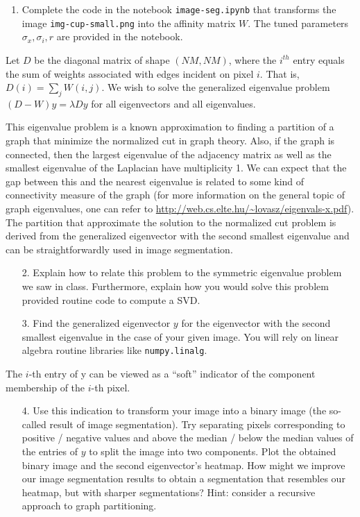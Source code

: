 \documentclass[11pt]{article}
\begin{document}
\begin{enumerate}
    \item Complete the code in the notebook \texttt{image-seg.ipynb} that transforms the image \texttt{img-cup-small.png} into the affinity matrix $W$. The tuned parameters $\sigma_x, \sigma_i, r$ are provided in the notebook.
\end{enumerate}

Let $D$ be the diagonal matrix of shape $(NM, NM)$, where the $i^{th}$ entry equals the sum of weights associated with edges incident on pixel $i$. That is, $D(i) = \sum_{j} W(i, j)$. We wish to solve the generalized eigenvalue problem $(D - W)y = \lambda Dy$ for all eigenvectors and all eigenvalues.

This eigenvalue problem is a known approximation to finding a partition of a graph that minimize the normalized cut in graph theory. Also, if the graph is connected, then the largest eigenvalue of the adjacency matrix as well as the smallest eigenvalue of the Laplacian have multiplicity 1. We can expect that the gap between this and the nearest eigenvalue is related to some kind of connectivity measure of the graph (for more information on the general topic of graph eigenvalues, one can refer to \url{http://web.cs.elte.hu/~lovasz/eigenvals-x.pdf}). The partition that approximate the solution to the normalized cut problem is derived from the generalized eigenvector with the second smallest eigenvalue and can be straightforwardly used in image segmentation.

\begin{enumerate}
    \item[2.] Explain how to relate this problem to the symmetric eigenvalue problem we saw in class. Furthermore, explain how you would solve this problem provided routine code to compute a SVD.
\end{enumerate}

\begin{enumerate}
    \item[3.] Find the generalized eigenvector $y$ for the eigenvector with the second smallest eigenvalue in the case of your given image. You will rely on linear algebra routine libraries like \texttt{numpy.linalg}.
\end{enumerate}

The $i$-th entry of y can be viewed as a “soft” indicator of the component membership of the $i$-th pixel.

\begin{enumerate}

\item[4.] Use this indication to transform your image into a binary image (the so-called result of image segmentation). Try separating pixels corresponding to positive / negative values and above the median / below the median values of the entries of $y$ to split the image into two components. Plot the obtained binary image and the second eigenvector's heatmap. How might we improve our image segmentation results to obtain a segmentation that resembles our heatmap, but with sharper segmentations? Hint: consider a recursive approach to graph partitioning.
\end{enumerate}
\end{document}
